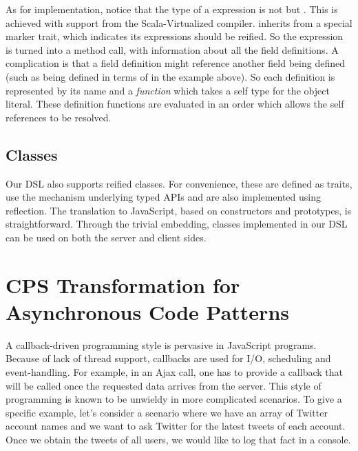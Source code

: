 \documentclass[runningheads,a4paper]{llncs}
\begin{document}
As for implementation, notice that the type of a  expression is not  but
. This is achieved with support from the
Scala-Virtualized compiler.  inherits from a special marker
trait, which indicates its  expressions should be
reified. So the  expression is turned into a method call,
with information about all the field definitions. A complication is
that a field definition might reference another field being defined
(such as  being defined in terms of  in the example
above). So each definition is represented by its name and a {\it
  function} which takes a self type for the object literal. These
definition functions are evaluated in an order which allows the self
references to be resolved.

\subsection{Classes}
Our DSL also supports reified classes. For convenience, these are
defined as traits, use the  mechanism underlying typed
APIs and are also implemented using reflection. The translation to
JavaScript, based on constructors and prototypes, is
straightforward. Through the trivial embedding, classes implemented in
our DSL can be used on both the server and client sides.


\section{CPS Transformation for Asynchronous Code Patterns}\label{sec:cps}
  A callback-driven programming style is pervasive in JavaScript programs. Because of lack of thread support, callbacks are used for I/O, scheduling and event-handling. For example, in an Ajax call, one has to provide a callback that will be called once the requested data arrives from the server. This style of programming is known to be unwieldy in more complicated scenarios. To give a specific example, let's consider a scenario where we have an array of Twitter account names and we want to ask Twitter for the latest tweets of each account. Once we obtain the tweets of all users, we would like to log that fact in a console.
\end{document}
